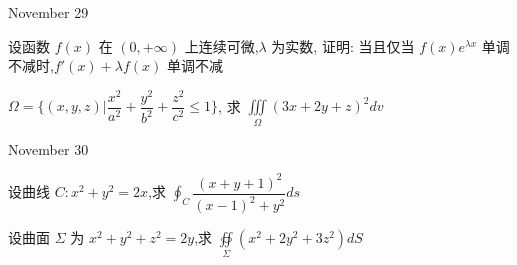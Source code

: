 \begin{solution}
	
\end{solution}


\textcolor{purplea}{November 29}

\begin{example}[][Exam: 37.4.15]
	设函数 $f(x)$ 在 $(0,+\infty)$ 上连续可微,$\lambda$ 为实数,
证明: 当且仅当 $f(x)e^{\lambda x}$ 单调不减时,$f'(x)+\lambda f(x)$ 单调不减
\end{example}

\begin{solution}
	
\end{solution}

\begin{example}[][Exam: 37.4.16]
	$\Omega = \{(x,y,z)\big|\dfrac{x^{2}}{a^{2}}+\dfrac{y^{2}}{b^{2}}+\dfrac{z^{2}}{c^{2}}\leq 1\}$,
求 $\displaystyle{\iiint\limits_{\Omega}(3x+2y+z)^{2}dv}$
\end{example}

\begin{solution}
	
\end{solution}


\textcolor{purplea}{November 30}

\begin{example}[][Exam: 37.4.17]
	设曲线 $C:x^{2}+y^{2}=2x$,求 $\displaystyle{\oint_{C}\dfrac{(x+y+1)^{2}}{(x-1)^{2}+y^{2}}ds}$
\end{example}

\begin{solution}
	
\end{solution}

\begin{example}[][Exam: 37.4.18]
	设曲面 $\Sigma$ 为 $x^{2}+y^{2}+z^{2}=2y$,求 $\displaystyle{\oiint\limits_{\Sigma}(x^{2}+2y^{2}+3z^{2})dS}$

\end{example}
\begin{solution}
	
\end{solution}
